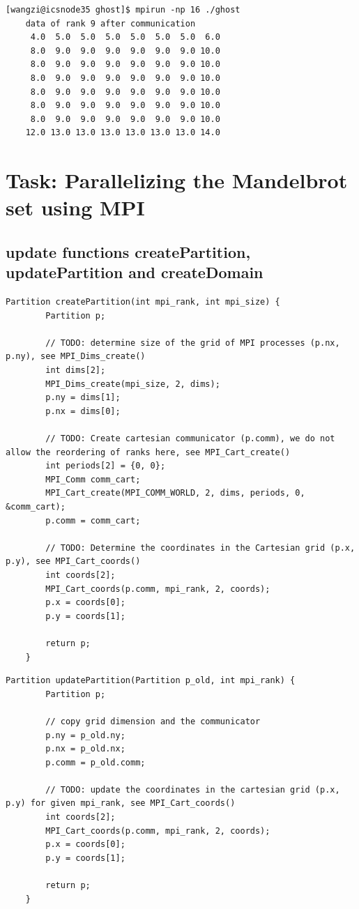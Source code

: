 \documentclass[unicode,11pt,a4paper,oneside,numbers=endperiod,openany]{scrartcl}
\begin{document}
\begin{lstlisting}[style=mystyle, language=MyBash, caption={Output of Ghost Cell Communication}]
    [wangzi@icsnode35 ghost]$ mpirun -np 16 ./ghost
    data of rank 9 after communication
     4.0  5.0  5.0  5.0  5.0  5.0  5.0  6.0
     8.0  9.0  9.0  9.0  9.0  9.0  9.0 10.0
     8.0  9.0  9.0  9.0  9.0  9.0  9.0 10.0
     8.0  9.0  9.0  9.0  9.0  9.0  9.0 10.0
     8.0  9.0  9.0  9.0  9.0  9.0  9.0 10.0
     8.0  9.0  9.0  9.0  9.0  9.0  9.0 10.0
     8.0  9.0  9.0  9.0  9.0  9.0  9.0 10.0
    12.0 13.0 13.0 13.0 13.0 13.0 13.0 14.0
\end{lstlisting}
    


\section{Task: Parallelizing the Mandelbrot set using MPI}
\subsection{update functions createPartition, updatePartition and createDomain}
\begin{lstlisting}[style=mystyle, language=MyC++, caption={Cartesian Partition Creation}]
    Partition createPartition(int mpi_rank, int mpi_size) {
        Partition p;
    
        // TODO: determine size of the grid of MPI processes (p.nx, p.ny), see MPI_Dims_create()
        int dims[2];
        MPI_Dims_create(mpi_size, 2, dims);
        p.ny = dims[1];
        p.nx = dims[0];
    
        // TODO: Create cartesian communicator (p.comm), we do not allow the reordering of ranks here, see MPI_Cart_create()
        int periods[2] = {0, 0};
        MPI_Comm comm_cart;
        MPI_Cart_create(MPI_COMM_WORLD, 2, dims, periods, 0, &comm_cart);
        p.comm = comm_cart;
        
        // TODO: Determine the coordinates in the Cartesian grid (p.x, p.y), see MPI_Cart_coords()
        int coords[2];
        MPI_Cart_coords(p.comm, mpi_rank, 2, coords);
        p.x = coords[0];
        p.y = coords[1];
    
        return p;
    }
\end{lstlisting}

\begin{lstlisting}[style=mystyle, language=MyC++, caption={Updating Cartesian Partition Coordinates}]
    Partition updatePartition(Partition p_old, int mpi_rank) {
        Partition p;
    
        // copy grid dimension and the communicator
        p.ny = p_old.ny;
        p.nx = p_old.nx;
        p.comm = p_old.comm;
        
        // TODO: update the coordinates in the cartesian grid (p.x, p.y) for given mpi_rank, see MPI_Cart_coords()
        int coords[2];
        MPI_Cart_coords(p.comm, mpi_rank, 2, coords);
        p.x = coords[0];
        p.y = coords[1];
    
        return p;
    }
\end{lstlisting}
\end{document}
